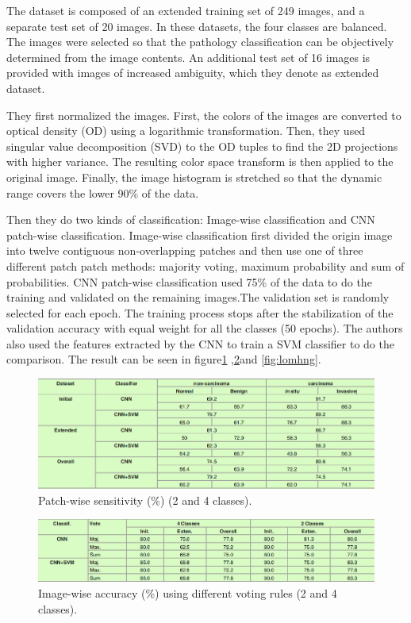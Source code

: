 \documentclass[10pt,twocolumn,letterpaper]{article}
\begin{document}
The dataset is composed of an extended training set of 249 images, and a separate test set of 20 images. In these datasets, the four classes are balanced. The images were selected so that the pathology classification can be objectively determined from the image contents. An additional
test set of 16 images is provided with images of increased ambiguity, which they denote as extended dataset.

They first normalized the images. First, the colors of the images are converted to optical density (OD) using a logarithmic transformation. Then, they used singular value decomposition (SVD)  to the OD tuples to find the 2D projections with higher variance. The resulting color space transform is then applied to the original image. Finally, the image histogram is stretched so that the dynamic range covers the lower 90\% of the data.

Then they do two kinds of classification: Image-wise classification and CNN patch-wise classification. Image-wise classification first divided the origin image into twelve contiguous non-overlapping patches and then use one of three different patch patch methods: majority voting, maximum probability and sum of probabilities. CNN patch-wise classification used 75\% of the data to do the training and validated on the remaining images.The validation set is randomly selected for each epoch. The training process stops after the stabilization of the validation accuracy with equal weight for all the classes (50 epochs). The authors also used the features extracted by the CNN to train a SVM classifier to do the comparison. The result can be seen in figure\ref{fig:ldgfhong} ,\ref{fig:loghng}and \ref{fig:lomhng}.

\begin{figure}[t]
	\begin{center}
		\includegraphics[width=0.8\linewidth]{Pic/13.png}
	\end{center}
	\caption{Patch-wise sensitivity (\%) (2 and 4 classes).}
	\label{fig:ldgfhong}

\end{figure}

\begin{figure}[t]
	\begin{center}
		\includegraphics[width=0.8\linewidth]{Pic/15.png}
	\end{center}
	\caption{Image-wise accuracy (\%) using different voting rules (2 and 4 classes).}
	\label{fig:loghng}

\end{figure}
\end{document}
